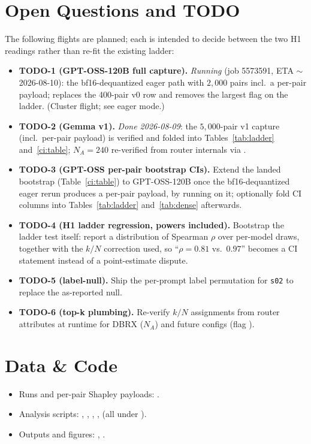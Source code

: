 \documentclass[sigconf]{acmart}
\begin{document}
\section{Open Questions and TODO}
\label{sec:todo}
The following flights are planned; each is intended to decide between the
two H1 readings rather than re-fit the existing ladder:
\begin{itemize}\setlength\itemsep{0pt}
\item \textbf{TODO-1 (GPT-OSS-120B full capture).} \emph{Running} (job
  5573591, ETA $\sim$2026-08-10): the bf16-dequantized eager path with
  $2{,}000$ pairs incl.\ a per-pair payload; replaces the 400-pair v0 row
  and removes the largest flag on the ladder. (Cluster flight; see
   eager mode.)
\item \textbf{TODO-2 (Gemma v1).} \emph{Done 2026-08-09}: the $5{,}000$-pair
  v1 capture (incl.\ per-pair payload) is verified and folded into
  Tables~\ref{tab:ladder} and~\ref{ci:table}; $N_A = 240$ re-verified
  from router internals via .
\item \textbf{TODO-3 (GPT-OSS per-pair bootstrap CIs).} Extend the landed
  bootstrap (Table~\ref{ci:table}) to GPT-OSS-120B once the
  bf16-dequantized eager rerun produces a per-pair payload, by running
   on it; optionally fold CI columns into
  Tables~\ref{tab:ladder} and~\ref{tab:dense} afterwards.
\item \textbf{TODO-4 (H1 ladder regression, powers included).}
  Bootstrap the ladder test itself: report a distribution of Spearman
  $\rho$ over per-model draws, together with the $k/N$ correction used,
  so ``$\rho = 0.81$ vs.\ $0.97$'' becomes a CI statement instead of a
  point-estimate dispute.
\item \textbf{TODO-5 (label-null).} Ship the per-prompt label permutation
  for \texttt{s02} to replace the as-reported null.
\item \textbf{TODO-6 (top-k plumbing).} Re-verify $k/N$ assignments from
  router attributes at runtime for DBRX ($N_A$) and future configs
  (flag ).
\end{itemize}

\section*{Data \& Code}
\begin{itemize}\setlength\itemsep{0pt}
\item Runs and per-pair Shapley payloads:
  .
\item Analysis scripts: ,
  , ,
  , 
  (all under ).
\item Outputs and figures: ,
  .
\end{itemize}
\end{document}
